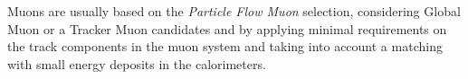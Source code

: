 Muons are usually based on the \emph{Particle Flow Muon} selection, considering Global Muon or a Tracker Muon candidates and by applying minimal requirements on the track components in the muon system and taking into account a matching with small energy deposits in the calorimeters. %



